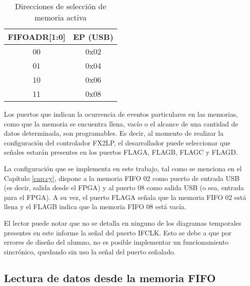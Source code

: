 \begin{table}[ht]
	\centering
	\begin{tabular}{cc}
		\hline
		FIFOADR[1:0] & EP (USB)\\
		\hline
		00 & 0x02\\
		01 & 0x04\\
		10 & 0x06\\
		11 & 0x08\\
		\hline
	\end{tabular}
	\caption{Direcciones de selección de memoria activa}
	\label{tab:fifoadr}
\end{table}

Los puertos que indican la ocurrencia de eventos particulares en las memorias, como que la memoria se encuentra llena, vacío o el alcance de una cantidad de datos determinada, son programables. Es decir, al momento de realizar la configuración del controlador FX2LP, el desarrollador puede seleccionar que señales estarán presentes en los puertos FLAGA, FLAGB, FLAGC y FLAGD.

La configuración que se implementa en este trabajo, tal como se menciona en el Capítulo \ref{cap:cy}, dispone a la memoria FIFO 02 como puerto de entrada USB (es decir, salida desde el FPGA) y al puerto 08 como salida USB (o sea, entrada para el FPGA). A su vez, el puerto FLAGA señala que la memoria FIFO 02 está llena y el FLAGB indica que la memoria FIFO 08 está vacía.

El lector puede notar que no se detalla en ninguno de los diagramas temporales presentes en este informe la señal del puerto IFCLK. Esto se debe a que por errores de diseño del alumno, no es posible implementar un funcionamiento sincrónico, quedando sin uso la señal del puerto señalado.

\subsection{Lectura de datos desde la memoria FIFO}

